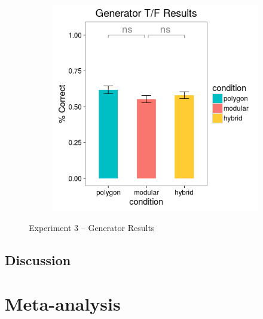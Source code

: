 \documentclass[11pt]{article}
\begin{document}
\begin{figure}[H]
\begin{subfigure}[c]{0.4\textwidth}
\includegraphics[width=\textwidth]{figures/3/gen_TF_r.png}
\end{subfigure}
\caption{Experiment 3 -- Generator Results}
\label{ex3_gen}
\end{figure}\noindent 
\subsection{Discussion}
\section{Meta-analysis}
\end{document}

